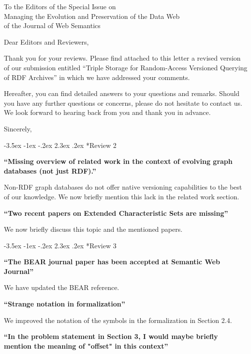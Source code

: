 \documentclass{letter}
\makeatletter
\newcounter{section}
\newcommand\section{\@startsection {section}{1}{\z@}%
                                   {-3.5ex \@plus -1ex \@minus -.2ex}%
                                   {2.3ex \@plus.2ex}%
                                   {\normalfont\Large\bfseries}}
\makeatother
\begin{document}
\begin{letter}{To the Editors of the Special Issue on\\Managing the Evolution and Preservation of the Data Web\\of the Journal of Web Semantics}

\opening{Dear Editors and Reviewers,}

\bigskip

Thank you for your reviews.
Please find attached to this letter a revised version of our submission entitled
\enquote{Triple Storage for Random-Access Versioned Querying of RDF Archives}
in which we have addressed your comments.

\bigskip

Hereafter, you can find detailed answers to your questions and remarks.
Should you have any further questions or concerns, please do not hesitate to contact us.
We look forward to hearing back from you and thank you in advance.

\bigskip

\closing{Sincerely,}

\pagebreak
\section*{Review 2}

\textbf{\enquote{Missing overview of related work in the context of evolving graph databases (not just RDF).}}

Non-RDF graph databases do not offer native versioning capabilities to the best of our knowledge.
We now briefly mention this lack in the related work section.

\textbf{\enquote{Two recent papers on Extended Characteristic Sets are missing}}

We now briefly discuss this topic and the mentioned papers.

\section*{Review 3}

\textbf{\enquote{The BEAR journal paper has been accepted at Semantic Web Journal}}

We have updated the BEAR reference.

\textbf{\enquote{Strange notation in formalization}}

We improved the notation of the symbols in the formalization in Section 2.4.

\textbf{\enquote{In the problem statement in Section 3, I would maybe briefly mention the meaning of "offset" in this context}}


\end{letter}
\end{document}
